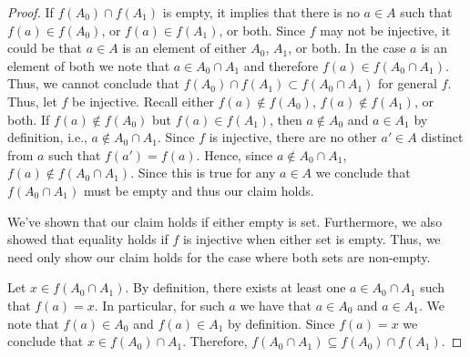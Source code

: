 \documentclass[12pt]{article}
\begin{document}
\begin{enumerate}
\begin{proof}
		If $f(A_0) \cap f(A_1)$ is empty, it implies that there is no $a \in A$
		such that $f(a) \in f(A_0)$, or $f(a) \in f(A_1)$, or both. Since $f$ may not be
		injective, it could be that $a \in A$ is an element of either 
		$A_0$, $A_1$, or both. In the case $a$ is an element of both we note that 
		$a \in A_0 \cap A_1$ and therefore $f(a) \in f(A_0 \cap A_1)$. Thus,
		we cannot conclude that $f(A_0) \cap f(A_1) \subset f(A_0 \cap A_1)$
		for general $f$. Thus, let $f$ be injective. Recall either $f(a) \notin f(A_0)$,
		$f(a) \notin f(A_1)$, or both. If $f(a) \notin f(A_0)$ but $f(a) \in f(A_1)$,
		then $a \notin A_0$ and $a \in A_1$ by definition, i.e., $a \notin A_0 \cap A_1$. 
		Since $f$ is injective, there are no other $a' \in A$ distinct from $a$ such that
		$f(a') = f(a)$. Hence, since $a \notin A_0 \cap A_1$, $f(a) \notin f(A_0 \cap A_1)$. 
		Since this is true for any $a \in A$ we conclude that $f(A_0 \cap A_1)$ must 
		be empty and thus our claim holds.
		
		We've shown that our claim holds if either empty is set. Furthermore, we also
		showed that equality holds if $f$ is injective when either set is empty.
		Thus, we need only show our claim holds for the case where both sets are 
		non-empty.
		
		Let $x \in f(A_0 \cap A_1)$. By definition, there exists at least one 
		$a \in A_0 \cap A_1$ such that $f(a) = x$. In particular, for such $a$ we
		have that $a \in A_0$ and $a \in A_1$. We note that $f(a) \in A_0$ and 
		$f(a) \in A_1$ by definition. Since $f(a) = x$ we conclude that 
		$x \in f(A_0) \cap A_1$. Therefore, $f(A_0 \cap A_1) \subseteq f(A_0) \cap f(A_1)$.
		

\end{proof}
\end{enumerate}
\end{document}
